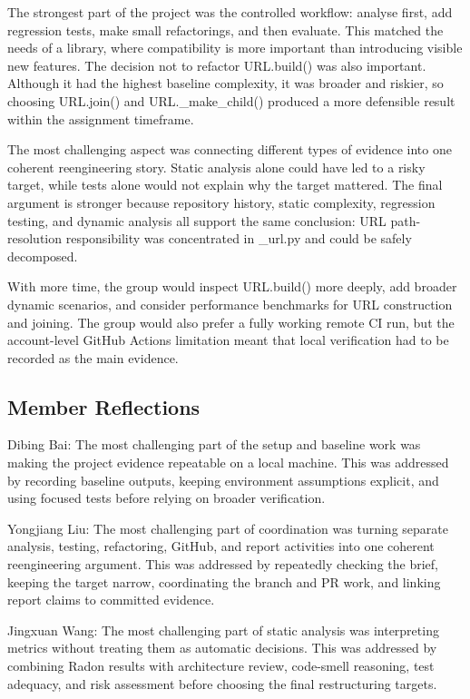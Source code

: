 \documentclass[11pt,a4paper]{article}
\begin{document}
The strongest part of the project was the controlled workflow: analyse first, add regression tests, make small refactorings, and then evaluate. This matched the needs of a library, where compatibility is more important than introducing visible new features. The decision not to refactor URL.build() was also important. Although it had the highest baseline complexity, it was broader and riskier, so choosing URL.join() and URL.\_make\_child() produced a more defensible result within the assignment timeframe.


The most challenging aspect was connecting different types of evidence into one coherent reengineering story. Static analysis alone could have led to a risky target, while tests alone would not explain why the target mattered. The final argument is stronger because repository history, static complexity, regression testing, and dynamic analysis all support the same conclusion: URL path-resolution responsibility was concentrated in \_url.py and could be safely decomposed.


With more time, the group would inspect URL.build() more deeply, add broader dynamic scenarios, and consider performance benchmarks for URL construction and joining. The group would also prefer a fully working remote CI run, but the account-level GitHub Actions limitation meant that local verification had to be recorded as the main evidence.


\subsection*{Member Reflections}


Dibing Bai: The most challenging part of the setup and baseline work was making the project evidence repeatable on a local machine. This was addressed by recording baseline outputs, keeping environment assumptions explicit, and using focused tests before relying on broader verification.


Yongjiang Liu: The most challenging part of coordination was turning separate analysis, testing, refactoring, GitHub, and report activities into one coherent reengineering argument. This was addressed by repeatedly checking the brief, keeping the target narrow, coordinating the branch and PR work, and linking report claims to committed evidence.


Jingxuan Wang: The most challenging part of static analysis was interpreting metrics without treating them as automatic decisions. This was addressed by combining Radon results with architecture review, code-smell reasoning, test adequacy, and risk assessment before choosing the final restructuring targets.
\end{document}
